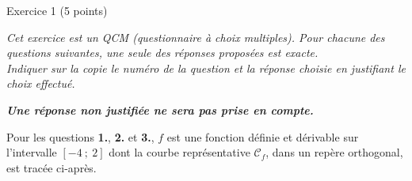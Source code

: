 
%
\begin{h2}Exercice 1 (5 points)\end{h2}
\par
\emph{Cet exercice est un QCM (questionnaire à choix multiples). Pour chacune des questions suivantes, une seule des réponses proposées est exacte. \\Indiquer sur la copie le numéro de la question et la réponse choisie en justifiant le choix effectué. }
\par
\medskip
\par
\emph{\textbf{Une réponse non justifiée ne sera pas prise en compte.}}
\par
Pour les questions \textbf{1.}, \textbf{2.} et \textbf{3.}, $f$ est une fonction définie et dérivable sur l'intervalle $[-4~;~2]$ dont la courbe représentative $\mathscr{C}_{f}$, dans un repère orthogonal, est tracée ci-après.
\par

